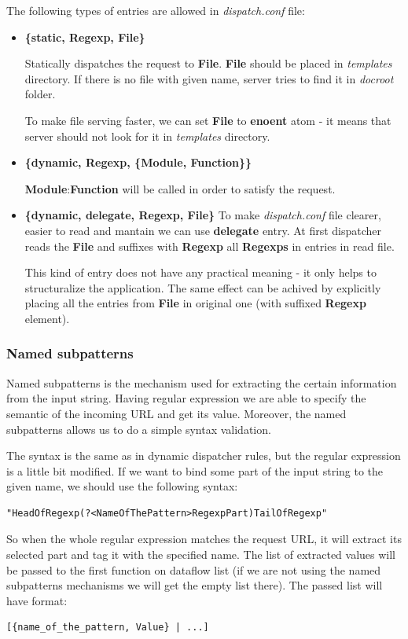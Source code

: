 The following types of entries are allowed in {\it dispatch.conf} file:
\begin{itemize}
\item {\bf \{static, Regexp, File\}}

Statically dispatches the request to {\bf File}. {\bf File} should be placed in {\it templates} directory. 
If there is no file with given name, server tries to find it in {\it docroot} folder. 

To make file serving faster, we can set {\bf File} to {\bf enoent} atom - it means that server should not look for it in {\it templates} directory.
\item {\bf \{dynamic, Regexp, \{Module, Function\}\}}

{\bf Module}:{\bf Function} will be called in order to satisfy the request.
\item {\bf \{dynamic, delegate, Regexp, File\}}
To make {\it dispatch.conf} file clearer, easier to read and mantain we can use {\bf delegate} entry. 
At first dispatcher reads the {\bf File} and suffixes with {\bf Regexp} all {\bf Regexps} in entries in read file. 

This kind of entry does not have any practical meaning - it only helps to structuralize the application. 
The same effect can be achived by explicitly placing all the entries from {\bf File} in original one (with suffixed {\bf Regexp} element).
\end{itemize}

\subsubsection{Named subpatterns}Named subpatterns is the mechanism used for extracting the certain information from the input string. 
Having regular expression we are able to specify the semantic of the incoming URL and get its value.
Moreover, the named subpatterns allows us to do a simple syntax validation.

The syntax is the same as in dynamic dispatcher rules, but the regular expression is a little bit modified. 
If we want to bind some part of the input string to the given name, we should use the following syntax:
\begin{verbatim}
"HeadOfRegexp(?<NameOfThePattern>RegexpPart)TailOfRegexp"
\end{verbatim}
So when the whole regular expression matches the request URL, it will extract its selected part and tag it with the specified name. 
The list of extracted values will be passed to the first function on dataflow list (if we are not using the named subpatterns mechanisms we will get the empty list there).
The passed list will have format:
\begin{verbatim}
[{name_of_the_pattern, Value} | ...]
\end{verbatim}

